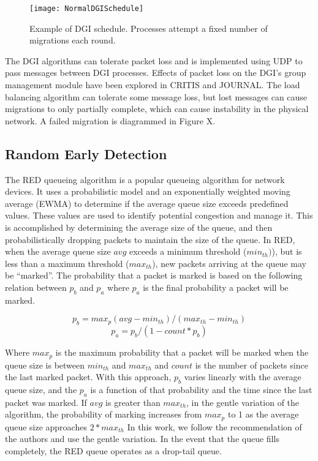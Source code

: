 \begin{figure}
\texttt{[image: NormalDGISchedule]}
\caption{Example of DGI schedule. Processes attempt a fixed number of migrations each round.} \label{fig:normal-schdule}
\end{figure}

The DGI algorithms can tolerate packet loss and is implemented using UDP to pass messages between DGI processes.
Effects of packet loss on the DGI's group management module have been explored in CRITIS and JOURNAL.
The load balancing algorithm can tolerate some message loss, but lost messages can cause migrations to only partially complete, which can cause instability in the physical network.
A failed migration is diagrammed in Figure X.

\subsection{Random Early Detection}
The RED queueing algorithm is a popular queueing algorithm for network devices.
It uses a probabilistic model and an exponentially weighted moving average (EWMA) to determine if the average queue size exceeds predefined values.
These values are used to identify potential congestion and manage it.
This is accomplished by determining the average size of the queue, and then probabilistically dropping packets to maintain the size of the queue.
In RED, when the average queue size $avg$ exceeds a minimum threshold ($min_{th})$), but is less than a maximum threshold ($max_{th}$), new packets arriving at the queue may be ``marked''.
The probability that a packet is marked is based on the following relation between $p_{b}$ and $p_{a}$ where $p_{a}$ is the final probability a packet will be marked.

\begin{equation}
p_{b} = max_p (avg - min_{th}) / (max_{th}-min_{th})
\end{equation}
\begin{equation}
p_{a} = p_{b} / (1-count * p_b)
\end{equation}

Where $max_p$ is the maximum probability that a packet will be marked when the queue size is between $min_{th}$ and $max_{th}$ and $count$ is the number of packets since the last marked packet.
With this approach, $p_{b}$ varies linearly with the average queue size, and the $p_{a}$ is a function of that probability and the time since the last packet was marked.
If $avg$ is greater than $max_{th}$, in the gentle variation of the algorithm, the probability of marking increases from $max_p$ to 1 as the average queue size approaches $2*max_{th}$
In this work, we follow the recommendation of the authors and use the gentle variation.
In the event that the queue fills completely, the RED queue operates as a drop-tail queue.


